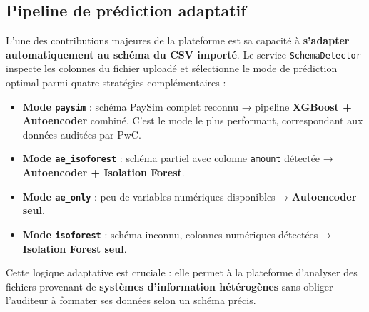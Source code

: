 \documentclass[12pt,a4paper,twoside]{report}
\begin{document}
\subsection{Pipeline de prédiction adaptatif}

L'une des contributions majeures de la plateforme est sa capacité à \textbf{s'adapter automatiquement au schéma du CSV importé}. Le service \texttt{SchemaDetector} inspecte les colonnes du fichier uploadé et sélectionne le mode de prédiction optimal parmi quatre stratégies complémentaires :

\begin{itemize}
  \item \textbf{Mode \texttt{paysim}} : schéma PaySim complet reconnu → pipeline \textbf{XGBoost + Autoencoder} combiné. C'est le mode le plus performant, correspondant aux données auditées par PwC.
  \item \textbf{Mode \texttt{ae\_isoforest}} : schéma partiel avec colonne \texttt{amount} détectée → \textbf{Autoencoder + Isolation Forest}.
  \item \textbf{Mode \texttt{ae\_only}} : peu de variables numériques disponibles → \textbf{Autoencoder seul}.
  \item \textbf{Mode \texttt{isoforest}} : schéma inconnu, colonnes numériques détectées → \textbf{Isolation Forest seul}.
\end{itemize}

Cette logique adaptative est cruciale : elle permet à la plateforme d'analyser des fichiers provenant de \textbf{systèmes d'information hétérogènes} sans obliger l'auditeur à formater ses données selon un schéma précis.
\end{document}
